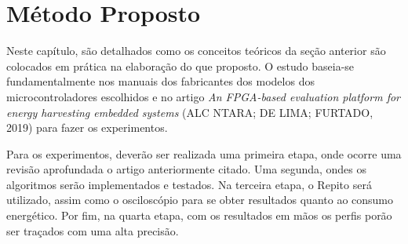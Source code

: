 \chapter{Método Proposto}\label{CAP3}
 Neste capítulo, são detalhados como os conceitos teóricos da seção anterior são colocados em prática na elaboração do que proposto. O estudo baseia-se fundamentalmente nos manuais dos fabricantes dos modelos dos microcontroladores escolhidos e no artigo {\itshape An FPGA-based evaluation platform for energy harvesting embedded systems} (ALC NTARA; DE LIMA; FURTADO, 2019) para fazer os experimentos.  

Para os experimentos, deverão ser realizada uma primeira etapa, onde ocorre uma revisão aprofundada o artigo anteriormente citado. Uma segunda, ondes os algoritmos serão implementados e testados. Na terceira etapa, o Repito será utilizado, assim como o osciloscópio para se obter resultados quanto ao consumo energético. Por fim, na quarta etapa, com os resultados em mãos os perfis porão ser traçados com uma alta precisão. 
 
